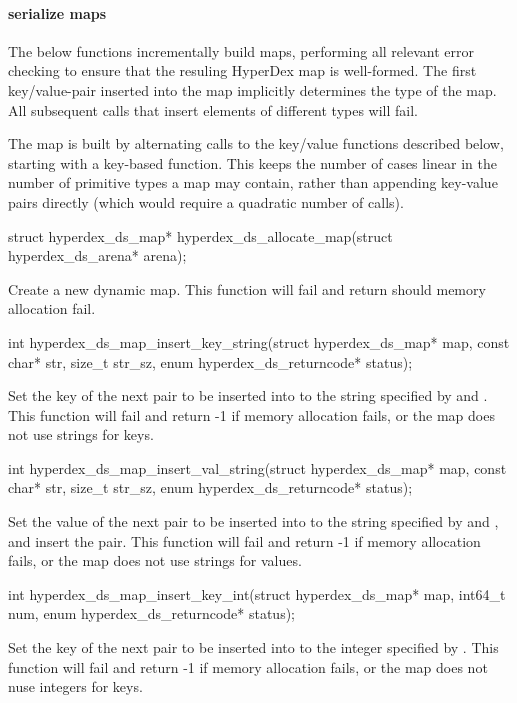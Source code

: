 \paragraph{serialize maps}

The below functions incrementally build maps, performing all relevant error
checking to ensure that the resuling HyperDex map is well-formed.  The first
key/value-pair inserted into the map implicitly determines the type of the map.  All
subsequent calls that insert elements of different types will fail.

The map is built by alternating calls to the key/value functions described
below, starting with a key-based function.  This keeps the number of cases
linear in the number of primitive types a map may contain, rather than appending
key-value pairs directly (which would require a quadratic number of calls).

\begin{ccode}
struct hyperdex_ds_map* hyperdex_ds_allocate_map(struct hyperdex_ds_arena* arena);
\end{ccode}
\funcdesc Create a new dynamic map.  This function will fail and return
 should memory allocation fail.

\funcsep
\begin{ccode}
int hyperdex_ds_map_insert_key_string(struct hyperdex_ds_map* map,
                                      const char* str, size_t str_sz,
                                      enum hyperdex_ds_returncode* status);
\end{ccode}
\funcdesc Set the key of the next pair to be inserted into  to the
string specified by  and .  This function will fail and
return -1 if memory allocation fails, or the map does not use strings for keys.

\funcsep
\begin{ccode}
int hyperdex_ds_map_insert_val_string(struct hyperdex_ds_map* map,
                                      const char* str, size_t str_sz,
                                      enum hyperdex_ds_returncode* status);
\end{ccode}
\funcdesc Set the value of the next pair to be inserted into  to the
string specified by  and , and insert the pair.  This
function will fail and return -1 if memory allocation fails, or the map does not
use strings for values.

\funcsep
\begin{ccode}
int hyperdex_ds_map_insert_key_int(struct hyperdex_ds_map* map,
                                   int64_t num,
                                   enum hyperdex_ds_returncode* status);
\end{ccode}
\funcdesc Set the key of the next pair to be inserted into  to the
integer specified by .  This function will fail and return -1 if
memory allocation fails, or the map does not nuse integers for keys.

